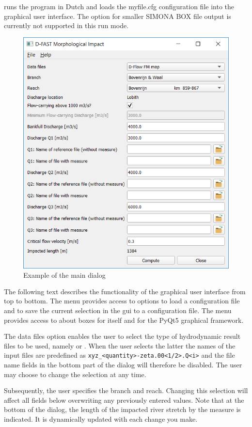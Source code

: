 runs the program in Dutch and loads the myfile.cfg configuration file into the graphical user interface.
The  option for smaller SIMONA BOX file output is currently not supported in this run mode.

\begin{figure}
\center
\includegraphics[width=12cm]{main_dialog.png}
\caption{Example of the main dialog}
\end{figure}

The following text describes the functionality of the graphical user interface from top to bottom.
The  menu provides access to options to load a configuration file and to save the current selection in the gui to a configuration file.
The  menu provides access to about boxes for \dfastmi itself and for the PyQt5 graphical framework.

The data files option enables the user to select the type of hydrodynamic result files to be used, namely  or .
When the user selects the latter the names of the input files are predefined as \texttt{xyz\_<quantity>-zeta.00<1/2>.Q<i>} and the file name fields in the bottom part of the dialog will therefore be disabled.
The user may choose to change the selection at any time.

Subsequently, the user specifies the branch and reach.
Changing this selection will affect all fields below overwriting any previously entered values.
Note that at the bottom of the dialog, the length  of the impacted river stretch by the measure is indicated.
It is dynamically updated with each change you make.

